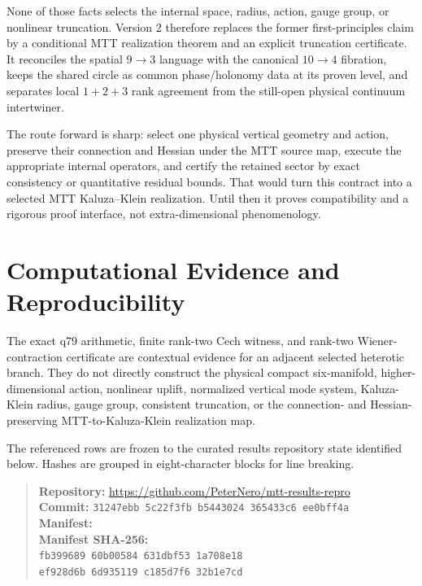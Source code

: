 \documentclass[11pt]{article}
\theoremstyle{definition}
\theoremstyle{remark}
\begin{document}
None of those facts selects the internal space, radius, action, gauge group,
or nonlinear truncation.  Version 2 therefore replaces the former
first-principles claim by a conditional MTT realization theorem and an
explicit truncation certificate.  It reconciles the spatial \(9\to3\)
language with the canonical \(10\to4\) fibration, keeps the shared circle as
common phase/holonomy data at its proven level, and separates local
\(1+2+3\) rank agreement from the still-open physical continuum
intertwiner.

The route forward is sharp: select one physical vertical geometry and
action, preserve their connection and Hessian under the MTT source map,
execute the appropriate internal operators, and certify the retained sector
by exact consistency or quantitative residual bounds.  That would turn this
contract into a selected MTT Kaluza--Klein realization.  Until then it proves
compatibility and a rigorous proof interface, not extra-dimensional
phenomenology.



\enlargethispage{3\baselineskip}

\section*{Computational Evidence and Reproducibility}
The exact q79 arithmetic, finite rank-two Cech witness, and rank-two Wiener-contraction certificate are contextual evidence for an adjacent selected heterotic branch. They do not directly construct the physical compact six-manifold, higher-dimensional action, nonlinear uplift, normalized vertical mode system, Kaluza-Klein radius, gauge group, consistent truncation, or the connection- and Hessian-preserving MTT-to-Kaluza-Klein realization map.

The referenced rows are frozen to the curated results repository state identified below. Hashes are grouped in eight-character blocks for line breaking.
\begin{quote}\small
\textbf{Repository:} \url{https://github.com/PeterNero/mtt-results-repro}\\
\textbf{Commit:} \texttt{31247ebb 5c22f3fb b5443024 365433c6 ee0bff4a}\\
\textbf{Manifest:} \\
\textbf{Manifest SHA-256:}\\
\texttt{fb399689 60b00584 631dbf53 1a708e18}\\
\texttt{ef928d6b 6d935119 c185d7f6 32b1e7cd}
\end{quote}
\end{document}
